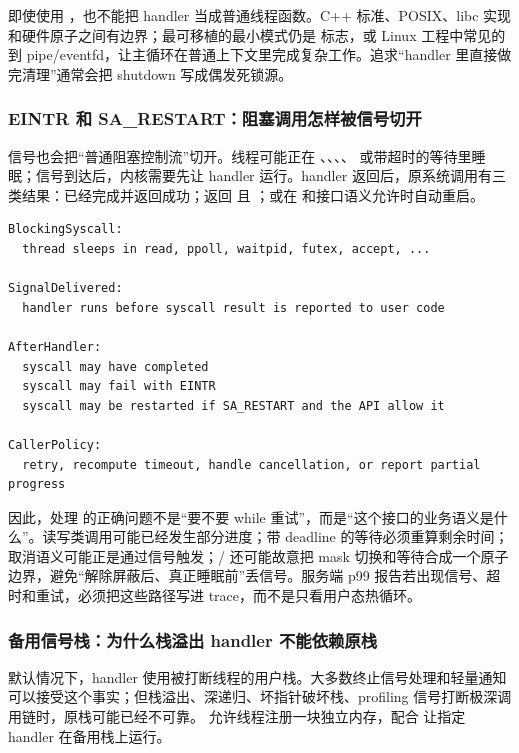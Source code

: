 即使使用 ，也不能把 handler 当成普通线程函数。C++ 标准、POSIX、libc 实现和硬件原子之间有边界；最可移植的最小模式仍是  标志，或 Linux 工程中常见的  到 pipe/eventfd，让主循环在普通上下文里完成复杂工作。追求“handler 里直接做完清理”通常会把 shutdown 写成偶发死锁源。

\subsubsection{EINTR 和 SA\_RESTART：阻塞调用怎样被信号切开}

信号也会把“普通阻塞控制流”切开。线程可能正在 、、、、 或带超时的等待里睡眠；信号到达后，内核需要先让 handler 运行。handler 返回后，原系统调用有三类结果：已经完成并返回成功；返回  且 ；或在  和接口语义允许时自动重启。

\begin{lstlisting}[numbers=none,caption={被信号打断的阻塞调用不能机械重试}]
BlockingSyscall:
  thread sleeps in read, ppoll, waitpid, futex, accept, ...

SignalDelivered:
  handler runs before syscall result is reported to user code

AfterHandler:
  syscall may have completed
  syscall may fail with EINTR
  syscall may be restarted if SA_RESTART and the API allow it

CallerPolicy:
  retry, recompute timeout, handle cancellation, or report partial progress
\end{lstlisting}

因此，处理  的正确问题不是“要不要 while 重试”，而是“这个接口的业务语义是什么”。读写类调用可能已经发生部分进度；带 deadline 的等待必须重算剩余时间；取消语义可能正是通过信号触发；/ 还可能故意把 mask 切换和等待合成一个原子边界，避免“解除屏蔽后、真正睡眠前”丢信号。服务端 p99 报告若出现信号、超时和重试，必须把这些路径写进 trace，而不是只看用户态热循环。

\subsubsection{备用信号栈：为什么栈溢出 handler 不能依赖原栈}

默认情况下，handler 使用被打断线程的用户栈。大多数终止信号处理和轻量通知可以接受这个事实；但栈溢出、深递归、坏指针破坏栈、profiling 信号打断极深调用链时，原栈可能已经不可靠。  允许线程注册一块独立内存，配合  让指定 handler 在备用栈上运行。

